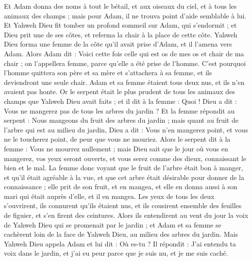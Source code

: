 \begin{multicols}{2}
Et Adam donna des noms à tout le bétail, et aux oiseaux du ciel, et à tous les animaux des champs ; mais pour Adam, il ne trouva point d'aide semblable à lui.
Et Yahweh Dieu fit tomber un profond sommeil sur Adam, qui s'endormit ; et Dieu prit une de ses côtes, et referma la chair à la place de cette côte.
Yahweh Dieu forma une femme de la côte qu'il avait prise d'Adam, et il l'amena vers Adam.
Alors Adam dit : Voici cette fois celle qui est os de mes os et chair de ma chair ; on l'appellera femme, parce qu'elle a été prise de l'homme.
C'est pourquoi l'homme quittera son père et sa mère et s'attachera à sa femme, et ils deviendront une seule chair.
Adam et sa femme étaient tous deux nus, et ils n'en avaient pas honte.
\VerseOne{}Or le serpent était le plus prudent de tous les animaux des champs que Yahweh Dieu avait faits ; et il dit à la femme : Quoi ! Dieu a dit : Vous ne mangerez pas de tous les arbres du jardin ?
Et la femme répondit au serpent : Nous mangeons du fruit des arbres du jardin ;
mais quant au fruit de l'arbre qui est au milieu du jardin, Dieu a dit : Vous n'en mangerez point, et vous ne le toucherez point, de peur que vous ne mouriez.
Alors le serpent dit à la femme : Vous ne mourrez nullement ;
mais Dieu sait que le jour où vous en mangerez, vos yeux seront ouverts, et vous serez comme des dieux, connaissant le bien et le mal.
La femme donc voyant que le fruit de l'arbre était bon à manger, et qu'il était agréable à la vue, et que cet arbre était désirable pour donner de la connaissance ; elle prit de son fruit, et en mangea, et elle en donna aussi à son mari qui était auprès d'elle, et il en mangea.
Les yeux de tous les deux s'ouvrirent, ils connurent qu'ils étaient nus, et ils cousirent ensemble des feuilles de figuier, et s'en firent des ceintures.
Alors ils entendirent au vent du jour la voix de Yahweh Dieu qui se promenait par le jardin ; et Adam et sa femme se cachèrent loin de la face de Yahweh Dieu, au milieu des arbres du jardin.
Mais Yahweh Dieu appela Adam et lui dit : Où es-tu ?
Il répondit : J'ai entendu ta voix dans le jardin, et j'ai eu peur parce que je suis nu, et je me suis caché.

\end{multicols}
